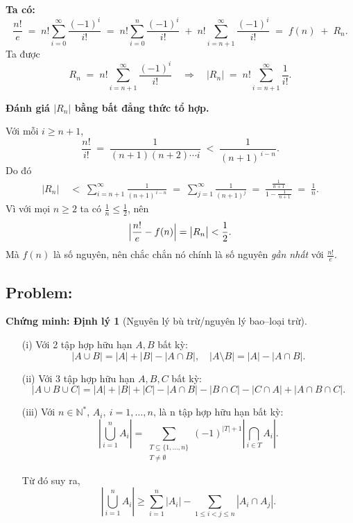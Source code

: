 \documentclass[a4paper,12pt]{article}
\begin{document}
\begin{enumerate}[label=(\alph*)]
\textbf{Ta có:}
\[
\frac{n!}{e}
\;=\;
n!\sum_{i=0}^{\infty}\frac{(-1)^i}{i!}
\;=\;
n!\sum_{i=0}^{n}\frac{(-1)^i}{i!}
\;+\;
n!\sum_{i=n+1}^{\infty}\frac{(-1)^i}{i!}
\;=\;
f(n)\;+\;R_n.
\]
Ta được
\[
R_n
\;=\;
n!\sum_{i=n+1}^{\infty}\frac{(-1)^i}{i!}
\quad\Longrightarrow\quad
\bigl|R_n\bigr|
\;=\;
n!\sum_{i=n+1}^{\infty}\frac{1}{i!}.
\]

\textbf{Đánh giá \(\bigl|R_n\bigr|\) bằng bất đẳng thức tổ hợp.} 

Với mỗi \(i\ge n+1\),
\[
\frac{n!}{i!}
\;=\;
\frac{1}{(n+1)(n+2)\cdots i}
\;<\;
\frac{1}{(n+1)^{\,i-n}}.
\]
Do đó
\begin{align*}
\bigl|R_n\bigr|
&\;<\;
\sum_{i=n+1}^{\infty}\frac{1}{(n+1)^{\,i-n}}
\;=\;
\sum_{j=1}^{\infty}\frac{1}{(n+1)^j}
\;=\;
\frac{\tfrac{1}{\,n+1\,}}{1-\tfrac{1}{\,n+1\,}}
\;=\;
\frac{1}{n}.
\end{align*}
Vì với mọi \(n\ge2\) ta có \(\tfrac1n\le\tfrac12\), nên
\[
\Bigl|\frac{n!}{e}-f(n)\Bigr|
=\bigl|R_n\bigr|
<\frac12.
\]
Mà \(f(n)\) là số nguyên, nên chắc chắn nó chính là số nguyên \emph{gần nhất} với \(\frac{n!}{e}\).
\end{enumerate}

\subsection*{Problem:}

\textbf{Chứng minh: Định lý 1} (Nguyên lý bù trừ/nguyên lý bao–loại trừ).\\
\begin{itemize}
    \item[(i)] Với 2 tập hợp hữu hạn $A, B$ bất kỳ:
    \[
    |A \cup B| = |A| + |B| - |A \cap B|,\quad |A \setminus B| = |A| - |A \cap B|.
    \]
    
    \item[(ii)] Với 3 tập hợp hữu hạn $A, B, C$ bất kỳ:
    \[
    |A \cup B \cup C| = |A| + |B| + |C| - |A \cap B| - |B \cap C| - |C \cap A| + |A \cap B \cap C|.
    \]

    \item[(iii)] Với $n \in \mathbb{N}^*$, $A_i,\ i=1,\ldots,n$, là n tập hợp hữu hạn bất kỳ:
    \[
    \left|\bigcup_{i=1}^{n} A_i \right| = \sum_{\substack{T \subseteq \{1, \ldots, n\} \\ T \neq \emptyset}} (-1)^{|T|+1} \left| \bigcap_{i \in T} A_i \right|.
    \]
    
    Từ đó suy ra,
    \[
    \left|\bigcup_{i=1}^{n} A_i \right| \geq \sum_{i=1}^{n} |A_i| - \sum_{1 \leq i < j \leq n} |A_i \cap A_j|.
    \]
\end{itemize}
\end{document}
